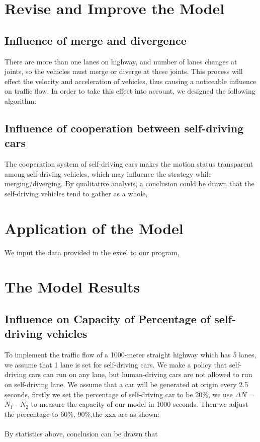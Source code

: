 \documentclass{icmmcm}
\begin{document}
\section{Revise and Improve the Model}
\subsection{Influence of merge and divergence}
There are more than one lanes on highway, and number of lanes changes at joints, so the vehicles must merge or diverge at these joints. This process will effect the velocity and acceleration of vehicles, thus causing a noticeable influence on traffic flow. In order to take this effect into account, we designed the following algorithm:\\
\subsection{Influence of cooperation between self-driving cars}
The cooperation system of self-driving cars makes the motion status transparent among self-driving vehicles, which may influence the strategy while merging/diverging. By qualitative analysis, a conclusion could be drawn that the self-driving vehicles tend to gather as a whole,
\section{Application of the Model}%
We input the data provided in the excel to our program, 
\section{The Model Results}
\subsection{Influence on Capacity of Percentage of self-driving vehicles}
To implement the traffic flow of a 1000-meter straight highway which has 5 lanes, we assume that 1 lane is set for self-driving cars. We make a policy that self-driving cars can run on any lane, but human-driving cars are not allowed to run on self-driving lane. We assume that a car will be generated at origin every 2.5 seconds, firstly we set the percentage of self-driving car to be 20$\%$, we use $\Delta N$ = $N_{1}$ - $N_{2}$ to measure the capacity of our model in 1000 seconds.%
Then we adjust the percentage to 60$\%$, 90$\%$,the xxx are as shown:\\
\\
By statistics above, conclusion can be drawn that 
\end{document}
